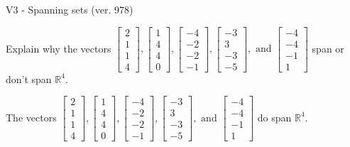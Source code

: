 \begin{exercise}
  \begin{exerciseTitle}V3 - Spanning sets (ver. 978)\end{exerciseTitle}
  \begin{exerciseStatement}
    Explain why the vectors \(\left[\begin{array}{r}
2 \\
1 \\
1 \\
4
\end{array}\right] , \left[\begin{array}{r}
1 \\
4 \\
4 \\
0
\end{array}\right] , \left[\begin{array}{r}
-4 \\
-2 \\
-2 \\
-1
\end{array}\right] , \left[\begin{array}{r}
-3 \\
3 \\
-3 \\
-5
\end{array}\right] , \text{ and } \left[\begin{array}{r}
-4 \\
-4 \\
-1 \\
1
\end{array}\right]\) span or don't span \(\mathbb{R}^4\). 
	


  \end{exerciseStatement}
  \begin{exerciseAnswer}
   The vectors \(\left[\begin{array}{r}
2 \\
1 \\
1 \\
4
\end{array}\right] , \left[\begin{array}{r}
1 \\
4 \\
4 \\
0
\end{array}\right] , \left[\begin{array}{r}
-4 \\
-2 \\
-2 \\
-1
\end{array}\right] , \left[\begin{array}{r}
-3 \\
3 \\
-3 \\
-5
\end{array}\right] , \text{ and } \left[\begin{array}{r}
-4 \\
-4 \\
-1 \\
1
\end{array}\right]\) 
  	 do  
	span \(\mathbb{R}^4\).
  



\end{exerciseAnswer}
\end{exercise}
